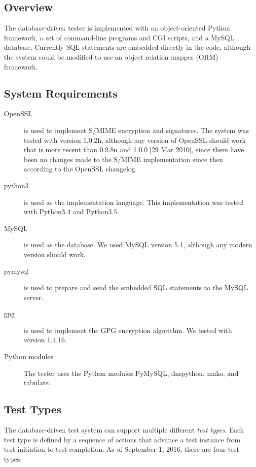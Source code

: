 \documentclass[preprint,3p]{elsarticle}
\begin{document}
\subsection{Overview}
The database-driven tester is implemented with an object-oriented
Python framework, a set of command-line programs and CGI scripts, and
a MySQL database. Currently SQL statements are embedded directly in
the code, although the system could be modified to use an object
relation mapper (ORM) framework. 

\subsection{System Requirements}

\begin{description}
\item[OpenSSL] is used to implement S/MIME encryption and
signatures. The system was tested with version 1.0.2h, although any
version of OpenSSL should work that is more recent than 0.9.8n and
1.0.0 [29 Mar 2010], since there have been no changes made to the
S/MIME implementation since then according to the OpenSSL changelog. 

\item[python3] is used as the implementation language. This
implementation was tested with Python3.4 and Python3.5. 

\item[MySQL] is used as the database. We used MySQL version 5.1,
although any modern version should work. 

\item[pymysql] is used to prepare and send the embedded SQL
statements to the MySQL server.

\item[gpg] is used to implement the GPG encryption
algorithm. We tested with version 1.4.16.

\item[Python modules] The tester uses the Python modules PyMySQL,
dnspython, mako, and tabulate.
\end{description}

\subsection{Test Types}
The database-driven test system can support multiple different
\emph{test types}. Each test type is defined by a sequence of actions
that advance a test instance from test initiation to test
completion. As of September 1, 2016, there are four test types:\\
\end{document}
